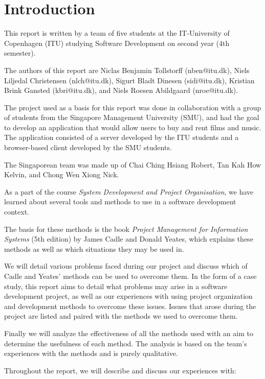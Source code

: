 \section{Introduction}

This report is written by a team of five students at the IT-University of Copenhagen (ITU)
studying Software Development on second year (4th semester).

The authors of this report are Niclas Benjamin Tollstorff (nben@itu.dk), Niels Liljedal
Christensen (nlch@itu.dk), Sigurt Bladt Dinesen (sidi@itu.dk), Kristian Brink Gansted
(kbri@itu.dk), and Niels Roesen Abildgaard (nroe@itu.dk).

The project used as a basis for this report was done in collaboration with a group of
students from the Singapore Management University (SMU), and had the goal to develop an
application that would allow users to buy and rent films and music. The application consisted
of a server developed by the ITU students and a browser-based client developed by the SMU
students.

The Singaporean team was made up of Chai Ching Hsiang Robert, Tan Kah How Kelvin, and
Chong Wen Xiong Nick.

As a part of the course \emph{System Development and Project Organisation}, we have learned
about several tools and methods to use in a software development context.

The basis for these methods is the book \emph{Project Management for Information Systems}
(5th edition) by James Cadle and Donald Yeates, which explains these methods as well
as which situations they may be used in.

We will detail various problems faced during our project and discuss which of Cadle and
Yeates' methods can be used to overcome them. In the form of a case study, this report
aims to detail what problems may arise in a software development project, as well as our
experiences with using project organization and development methods to overcome these
issues. Issues that arose during the project are listed and paired with the methods we
used to overcome them.

Finally we will analyze the effectiveness of all the methods used with an aim to determine
the usefulness of each method. The analysis is based on the team’s experiences with the
methods and is purely qualitative.

Throughout the report, we will describe and discuss our experiences with:

